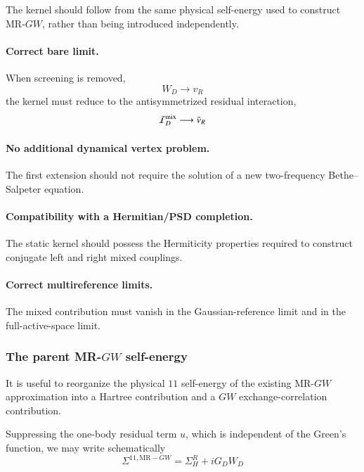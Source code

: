 \documentclass[aip,jcp,reprint,noshowkeys,superscriptaddress]{revtex4-1}
\begin{document}
The kernel should follow from the same physical self-energy used to
construct MR-$GW$, rather than being introduced independently.

\paragraph{Correct bare limit.}

When screening is removed,
\begin{equation}
  W_D
  \longrightarrow
  v_R
\end{equation}
the kernel must reduce to the antisymmetrized residual interaction,
\begin{equation}
  \mathcal I_D^{\rm mix}
  \longrightarrow
  \bar v_R
\end{equation}

\paragraph{No additional dynamical vertex problem.}

The first extension should not require the solution of a new
two-frequency Bethe--Salpeter equation.

\paragraph{Compatibility with a Hermitian/PSD completion.}

The static kernel should possess the Hermiticity properties required to
construct conjugate left and right mixed couplings.

\paragraph{Correct multireference limits.}

The mixed contribution must vanish in the Gaussian-reference limit and
in the full-active-space limit.


\subsubsection{The parent MR-\texorpdfstring{$GW$}{GW} self-energy}

It is useful to reorganize the physical $11$ self-energy of the
existing MR-$GW$ approximation into a Hartree contribution and a
$GW$ exchange-correlation contribution.

Suppressing the one-body residual term $u$, which is independent of the
Green's function, we may write schematically
\begin{equation}
  \Sigma^{11,\mathrm{MR-}GW}
  =
  \Sigma_H^R
  +
  iG_DW_D
  \label{eq:MRGW-Hedin-form}
\end{equation}
\end{document}
